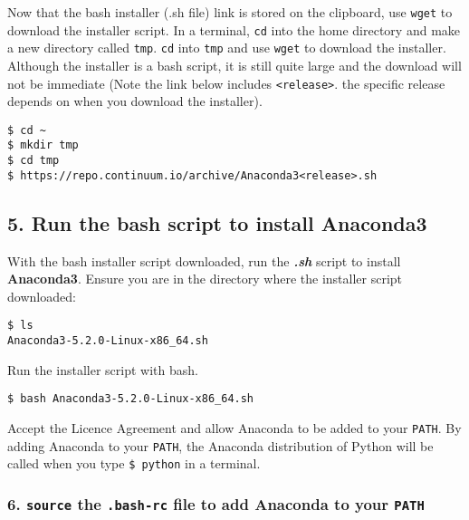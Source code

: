 \documentclass{book}
\newcommand{\passthrough}[1]{#1}
\begin{document}
Now that the bash installer (.sh file) link is stored on the clipboard,
use \passthrough{\lstinline!wget!} to download the installer script. In
a terminal, \passthrough{\lstinline!cd!} into the home directory and
make a new directory called \passthrough{\lstinline!tmp!}.
\passthrough{\lstinline!cd!} into \passthrough{\lstinline!tmp!} and use
\passthrough{\lstinline!wget!} to download the installer. Although the
installer is a bash script, it is still quite large and the download
will not be immediate (Note the link below includes
\passthrough{\lstinline!<release>!}. the specific release depends on
when you download the installer).

\begin{lstlisting}
$ cd ~
$ mkdir tmp
$ cd tmp
$ https://repo.continuum.io/archive/Anaconda3<release>.sh
\end{lstlisting}
    




    
        \hypertarget{run-the-bash-script-to-install-anaconda3}{%
\subsection{\texorpdfstring{5. Run the bash script to install
\textbf{Anaconda3}}{5. Run the bash script to install Anaconda3}}\label{run-the-bash-script-to-install-anaconda3}}

With the bash installer script downloaded, run the \textbf{\emph{.sh}}
script to install \textbf{Anaconda3}. Ensure you are in the directory
where the installer script downloaded:

\begin{lstlisting}
$ ls
Anaconda3-5.2.0-Linux-x86_64.sh
\end{lstlisting}

Run the installer script with bash.

\begin{lstlisting}
$ bash Anaconda3-5.2.0-Linux-x86_64.sh
\end{lstlisting}

Accept the Licence Agreement and allow Anaconda to be added to your
\passthrough{\lstinline!PATH!}. By adding Anaconda to your
\passthrough{\lstinline!PATH!}, the Anaconda distribution of Python will
be called when you type \passthrough{\lstinline!$ python!} in a
terminal.
    




    
        \hypertarget{source-the-.bash-rc-file-to-add-anaconda-to-your-path}{%
\subsubsection{\texorpdfstring{6. \texttt{source} the \texttt{.bash-rc}
file to add Anaconda to your
\texttt{PATH}}{6. source the .bash-rc file to add Anaconda to your PATH}}\label{source-the-.bash-rc-file-to-add-anaconda-to-your-path}}
\end{document}
